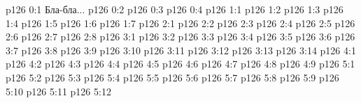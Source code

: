 \author{Промежуточные создания}
\vs p126 0:1  Бла-бла...
\vs p126 0:2 
\vs p126 0:3 \pc 
\vs p126 0:4 \pc 
{}
\vs p126 1:1 
\vs p126 1:2 
\vs p126 1:3 
\vs p126 1:4 
\vs p126 1:5 
\vs p126 1:6 
\vs p126 1:7 \pc 
{}
\vs p126 2:1 
\vs p126 2:2 \pc 
\vs p126 2:3 
\vs p126 2:4 
\vs p126 2:5 \pc 
\vs p126 2:6 \pc 
\vs p126 2:7 
\vs p126 2:8 
\vs p126 3:1 
\vs p126 3:2 
\vs p126 3:3 \pc 
\vs p126 3:4 
\vs p126 3:5 \pc 
\vs p126 3:6 \pc 
\vs p126 3:7 
\vs p126 3:8 \pc 
\vs p126 3:9 
\vs p126 3:10 
\vs p126 3:11 
\vs p126 3:12 \pc 
\vs p126 3:13 \pc 
\vs p126 3:14 
\vs p126 4:1 
\vs p126 4:2 \pc 
\vs p126 4:3 
\vs p126 4:4 
\vs p126 4:5 
\vs p126 4:6 
\vs p126 4:7 
\vs p126 4:8 \pc 
\vs p126 4:9 
\vs p126 5:1 
\vs p126 5:2 
\vs p126 5:3 
\vs p126 5:4 \pc 
\vs p126 5:5 
\vs p126 5:6 
\vs p126 5:7 \pc 
\vs p126 5:8 
\vs p126 5:9 
\vs p126 5:10 \pc 
\vs p126 5:11 
\vs p126 5:12 \pc 
\quizlink
